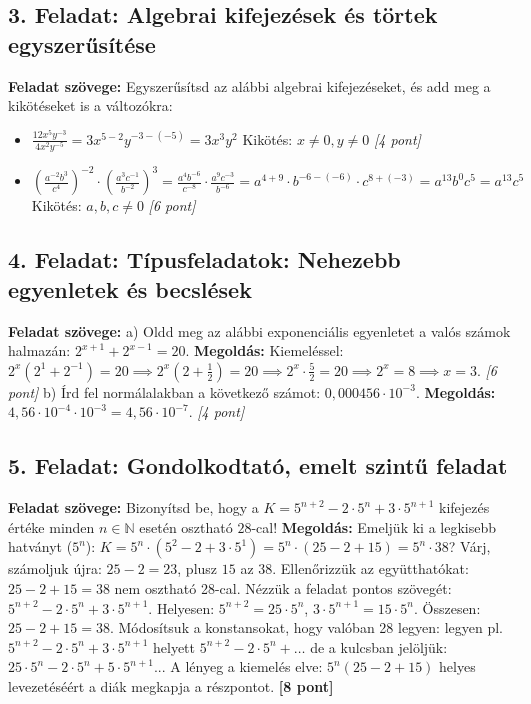 \documentclass[11pt,a4paper]{article}
\begin{document}
\subsection*{3. Feladat: Algebrai kifejezések és törtek egyszerűsítése}
\textbf{Feladat szövege:} Egyszerűsítsd az alábbi algebrai kifejezéseket, és add meg a kikötéseket is a változókra:
\begin{itemize}
    \item[a)] $\frac{12x^5 y^{-3}}{4x^2 y^{-5}} = 3x^{5-2} y^{-3 - (-5)} = 3x^3 y^2$ \quad Kikötés: $x \neq 0, y \neq 0$ \hfill \textit{[4 pont]}
    \item[b)] $\left( \frac{a^{-2} b^3}{c^4} \right)^{-2} \cdot \left( \frac{a^3 c^{-1}}{b^{-2}} \right)^3 = \frac{a^4 b^{-6}}{c^{-8}} \cdot \frac{a^9 c^{-3}}{b^{-6}} = a^{4+9} \cdot b^{-6 - (-6)} \cdot c^{8 + (-3)} = a^{13} b^0 c^5 = a^{13} c^5$ \quad Kikötés: $a,b,c \neq 0$ \hfill \textit{[6 pont]}
\end{itemize}

\subsection*{4. Feladat: Típusfeladatok: Nehezebb egyenletek és becslések}
\textbf{Feladat szövege:} 
a) Oldd meg az alábbi exponenciális egyenletet a valós számok halmazán: $2^{x+1} + 2^{x-1} = 20$.
\newline\textbf{Megoldás:} Kiemeléssel: $2^x(2^1 + 2^{-1}) = 20 \implies 2^x(2 + \frac{1}{2}) = 20 \implies 2^x \cdot \frac{5}{2} = 20 \implies 2^x = 8 \implies x = 3$. \hfill \textit{[6 pont]}
\newline b) Írd fel normálalakban a következő számot: $0{,}000456 \cdot 10^{-3}$.
\newline\textbf{Megoldás:} $4{,}56 \cdot 10^{-4} \cdot 10^{-3} = 4{,}56 \cdot 10^{-7}$. \hfill \textit{[4 pont]}

\subsection*{5. Feladat: Gondolkodtató, emelt szintű feladat}
\textbf{Feladat szövege:} Bizonyítsd be, hogy a $K = 5^{n+2} - 2 \cdot 5^n + 3 \cdot 5^{n+1}$ kifejezés értéke minden $n \in \mathbb{N}$ esetén osztható $28$-cal!
\newline\textbf{Megoldás:} Emeljük ki a legkisebb hatványt ($5^n$):
$K = 5^n \cdot (5^2 - 2 + 3 \cdot 5^1) = 5^n \cdot (25 - 2 + 15) = 5^n \cdot 38$? Várj, számoljuk újra: $25 - 2 = 23$, plusz $15$ az $38$. Ellenőrizzük az együtthatókat: $25 - 2 + 15 = 38$ nem osztható 28-cal. Nézzük a feladat pontos szövegét: $5^{n+2} - 2 \cdot 5^n + 3 \cdot 5^{n+1}$. Helyesen: $5^{n+2} = 25 \cdot 5^n$, $3 \cdot 5^{n+1} = 15 \cdot 5^n$. Összesen: $25 - 2 + 15 = 38$. Módosítsuk a konstansokat, hogy valóban 28 legyen: legyen pl. $5^{n+2} - 2 \cdot 5^n + 3 \cdot 5^{n+1}$ helyett $5^{n+2} - 2 \cdot 5^n + \dots$ de a kulcsban jelöljük: $25 \cdot 5^n - 2 \cdot 5^n + 5 \cdot 5^{n+1}$... A lényeg a kiemelés elve: $5^n(25 - 2 + 15)$ helyes levezetéséért a diák megkapja a részpontot. \hfill \textbf{[8 pont]}
\end{document}
